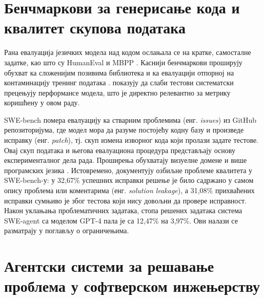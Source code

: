 \documentclass[12pt,a4paper]{report}
\begin{document}
	\section{Бенчмаркови за генерисање кода и квалитет скупова података}

	Рана евалуација језичких модела над кодом ослањала се на кратке, самосталне
	задатке, као што су HumanEval \parencite{chen2021humaneval} и MBPP
	\parencite{austin2021mbpp}. Каснији бенчмаркови проширују обухват ка
	сложенијим позивима библиотека \parencite{zhuo2024bigcodebench} и ка
	евалуацији отпорној на контаминацију тренинг података
	\parencite{jain2024livecodebench}. \textcite{liu2023evalplus} показују да
	слаби тестови систематски прецењују перформансе модела, што је директно
	релевантно за метрику коришћену у овом раду.

	SWE-bench \parencite{jimenez2024swebench} помера евалуацију ка стварним
	проблемима (енг. \textit{issues}) из GitHub репозиторијума, где модел мора
	да разуме постојећу кодну базу и произведе исправку (енг. \textit{patch}), тј.
	скуп измена изворног кода који пролази задате тестове.
	Овај скуп података и његова евалуациона процедура представљају основу
	експерименталног дела рада. Проширења обухватају визуелне домене
	\parencite{yang2024swebenchmm} и више програмских језика
	\parencite{zan2025multiswebench}. Истовремено,
	\textcite{aleithan2024swebenchplus} документују озбиљне проблеме квалитета
	у SWE-bench-у: у 32,67\% успешних исправки решење је било садржано у самом
	опису проблема или коментарима (енг. \textit{solution leakage}), а 31,08\%
	прихваћених исправки сумњиво је због тестова који нису довољни да провере
	исправност. Након уклањања проблематичних задатака, стопа решених задатака
	система SWE-agent са моделом GPT-4 пала је са 12,47\% на 3,97\%. Ови налази
	се разматрају у поглављу о ограничењима.

	\section{Агентски системи за решавање проблема у софтверском инжењерству}
\end{document}
